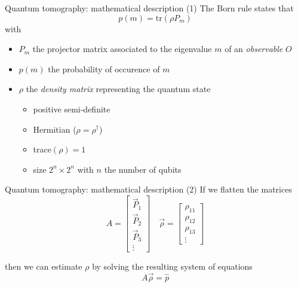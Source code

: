 \documentclass{beamer}
\newcommand{\tr}{\text{tr}}
\begin{document}
\begin{frame}{Quantum tomography: mathematical description (1)}
    The Born rule states that
    \begin{equation}
        p(m) = \tr(\rho P_m)
    \end{equation}
    with
    \begin{itemize}
        \item $P_m$ the projector matrix associated to the eigenvalue $m$ of an \textit{observable} $O$
        \item $p(m)$ the probability of occurence  of $m$
        \item $\rho$ the \textit{density matrix} representing the quantum state
        \begin{itemize}
            \item positive semi-definite
            \item Hermitian ($\rho = \rho^\dagger$)
            \item trace$(\rho)=1$
            \item size $2^n \times 2^n$ with $n$ the number of qubits
        \end{itemize}
    \end{itemize}
\end{frame}
\begin{frame}{Quantum tomography: mathematical description (2)}
    If we flatten the matrices
    \begin{equation}
        A = \begin{bmatrix}
            \vec P_1\\
            \vec P_2\\
            \vec P_3\\
            \vdots
        \end{bmatrix}
        \quad\vec{\rho} = \begin{bmatrix}
            \rho_{11} \\
            \rho_{12} \\
            \rho_{13} \\
            \vdots
        \end{bmatrix}
    \end{equation}

    then we can estimate $\rho$ by solving the resulting system of equations 
    \begin{equation}
        A\vec{\rho} = \hat p
    \end{equation}
\end{frame}
\end{document}

